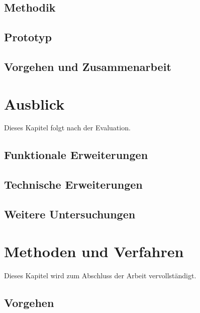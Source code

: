 \documentclass[12pt,a4paper]{scrreprt}
\begin{document}
\section{Methodik}
\section{Prototyp}
\section{Vorgehen und Zusammenarbeit}

\chapter{Ausblick}
Dieses Kapitel folgt nach der Evaluation.
\section{Funktionale Erweiterungen}
\section{Technische Erweiterungen}
\section{Weitere Untersuchungen}

\chapter{Methoden und Verfahren}
Dieses Kapitel wird zum Abschluss der Arbeit vervollständigt.
\section{Vorgehen}
\end{document}
